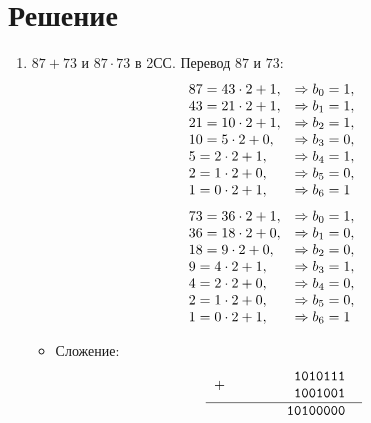 \documentclass[oneside,a4paper,14pt]{extarticle} %
\begin{document}
    \section*{Решение}
    \begin{enumerate}
        \item $87 + 73$ и $87 \cdot 73$ в 2СС. Перевод $87$ и $73$:
            $$
                \begin{array}[c]{ll}
                87 = 43\cdot 2 + 1, &\Rightarrow b_{0}=1, \\
                43 =21 \cdot 2 + 1,  &\Rightarrow b_{1}=1, \\
                21=10\cdot 2 + 1,   &\Rightarrow b_{2}=1, \\
                10=5\cdot 2 + 0,    &\Rightarrow b_{3}=0, \\
                5=2\cdot 2 + 1,     &\Rightarrow b_{4}=1, \\
                2=1\cdot 2 + 0,      &\Rightarrow b_{5}=0, \\
                1=0\cdot 2 + 1,       &\Rightarrow b_{6}=1
                \end{array}
            $$
            $$
                \begin{array}[c]{ll}
                73 = 36\cdot 2 + 1, &\Rightarrow b_{0}=1, \\
                36 = 18 \cdot 2 + 0,  &\Rightarrow b_{1}=0, \\
                18=9\cdot 2 + 0,   &\Rightarrow b_{2}=0, \\
                9=4\cdot 2 + 1,    &\Rightarrow b_{3}=1, \\
                4=2\cdot 2 + 0,     &\Rightarrow b_{4}=0, \\
                2=1\cdot 2 + 0,      &\Rightarrow b_{5}=0, \\
                1=0\cdot 2 + 1,       &\Rightarrow b_{6}=1
                \end{array}
            $$
            \begin{itemize}
                \item Сложение:
            $$    
                \begin{tabular}{{c}{c}}
                \texttt{$+$ }&
                \begin{tabular}{c}
                \texttt{~~~~~~1010111}\\
                \texttt{~~~~~~1001001}\\
                \end{tabular} \\ 
                \hline
                & \texttt{~~~~~10100000}\\
                \end{tabular}
            $$


\end{itemize}
\end{enumerate}
\end{document}
